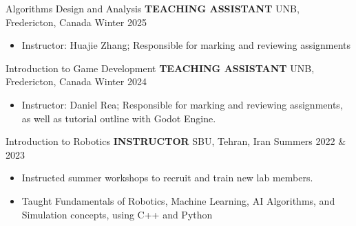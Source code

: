\begin{cventries}
    \cventry
    {Algorithms Design and Analysis}
    {\textbf{TEACHING ASSISTANT}}
    {UNB, Fredericton, Canada}
    {Winter 2025}
    {
        \begin{itemize}
            \item Instructor: Huajie Zhang; Responsible for marking and reviewing assignments
        \end{itemize}
    }
    \vspace{0.4 cm}
\end{cventries}
    
\begin{cventries}
    \cventry
    {Introduction to Game Development}
    {\textbf{TEACHING ASSISTANT}}
    {UNB, Fredericton, Canada}
    {Winter 2024}
    {
        \begin{itemize}
            \item Instructor: Daniel Rea; Responsible for marking and reviewing assignments, as well as tutorial outline with Godot Engine.
        \end{itemize}
    }
    \vspace{0.4 cm}
\end{cventries}

\begin{cventries}
    \cventry
    {Introduction to Robotics}
    {\textbf{INSTRUCTOR}}
    {SBU, Tehran, Iran}
    {Summers 2022 \& 2023}
    {
        \begin{itemize}
            \item Instructed summer workshops to recruit and train new lab members.
            \item Taught Fundamentals of Robotics, Machine Learning, AI Algorithms, and Simulation concepts, using C++ and Python
        \end{itemize}
    }
    \vspace{0.4 cm}
\end{cventries}

